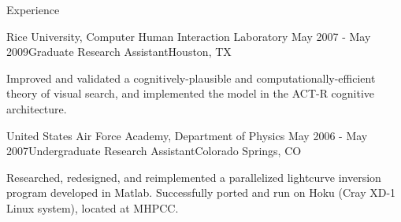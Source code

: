 \begin{rSection}{Experience}
  \begin{rSubsection}{Rice University, Computer Human Interaction Laboratory}
    {May 2007 - May 2009}{Graduate Research Assistant}{Houston, TX}
  \item Improved and validated a cognitively-plausible and computationally-efficient theory of visual search, 
    and implemented the model in the ACT-R cognitive architecture.
  \end{rSubsection}

  \begin{rSubsection}{United States Air Force Academy, Department of Physics}
    {May 2006 - May 2007}{Undergraduate Research Assistant}{Colorado Springs, CO}
  \item Researched, redesigned, and reimplemented a parallelized lightcurve inversion program developed in Matlab.
    Successfully ported and run on Hoku (Cray XD-1 Linux system), located at MHPCC.
  \end{rSubsection}


\end{rSection}
